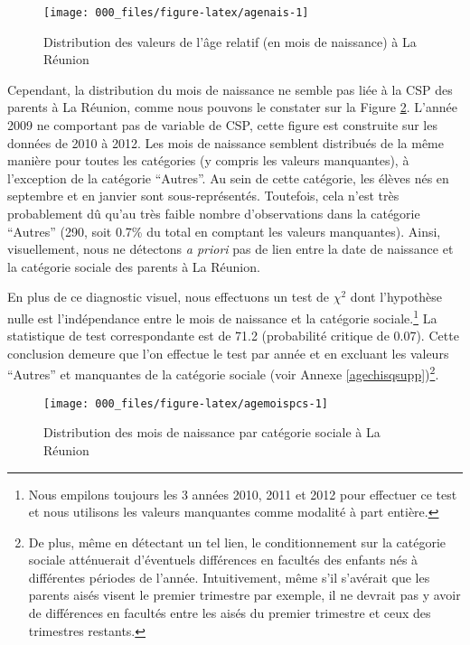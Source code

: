 \documentclass[
]{book}
\begin{document}
\begin{figure}[H]

{\centering \texttt{[image: 000\_files/figure-latex/agenais-1]} 

}

\caption{Distribution des valeurs de l'âge relatif (en mois de naissance) à La Réunion}\label{fig:agenais}
\end{figure}

Cependant, la distribution du mois de naissance ne semble pas liée à la CSP des parents à La Réunion, comme nous pouvons le constater sur la Figure \ref{fig:agemoispcs}. L'année 2009 ne comportant pas de variable de CSP, cette figure est construite sur les données de 2010 à 2012. Les mois de naissance semblent distribués de la même manière pour toutes les catégories (y compris les valeurs manquantes), à l'exception de la catégorie ``Autres''. Au sein de cette catégorie, les élèves nés en septembre et en janvier sont sous-représentés. Toutefois, cela n'est très probablement dû qu'au très faible nombre d'observations dans la catégorie ``Autres'' (290, soit 0.7\% du total en comptant les valeurs manquantes). Ainsi, visuellement, nous ne détectons \emph{a priori} pas de lien entre la date de naissance et la catégorie sociale des parents à La Réunion.

En plus de ce diagnostic visuel, nous effectuons un test de \(\chi^2\) dont l'hypothèse nulle est l'indépendance entre le mois de naissance et la catégorie sociale.\footnote{Nous empilons toujours les 3 années 2010, 2011 et 2012 pour effectuer ce test et nous utilisons les valeurs manquantes comme modalité à part entière.} La statistique de test correspondante est de 71.2 (probabilité critique de 0.07). Cette conclusion demeure que l'on effectue le test par année et en excluant les valeurs ``Autres'' et manquantes de la catégorie sociale (voir Annexe \ref{agechisqsupp})\footnote{De plus, même en détectant un tel lien, le conditionnement sur la catégorie sociale atténuerait d'éventuels différences en facultés des enfants nés à différentes périodes de l'année. Intuitivement, même s'il s'avérait que les parents aisés visent le premier trimestre par exemple, il ne devrait pas y avoir de différences en facultés entre les aisés du premier trimestre et ceux des trimestres restants.}.~

\begin{figure}[H]

{\centering \texttt{[image: 000\_files/figure-latex/agemoispcs-1]} 

}

\caption{Distribution des mois de naissance par catégorie sociale à La Réunion}\label{fig:agemoispcs}
\end{figure}
\end{document}

